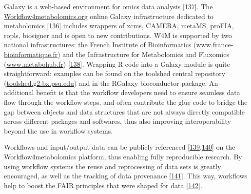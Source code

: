 \documentclass[]{article}
\begin{document}
Galaxy is a web-based environment for omics data analysis {[}\protect\hyperlink{ref-goecks_2010}{137}{]}. The \href{http://workflow4metabolomics.org}{Workflow4metabolomics.org} online Galaxy infrastructure dedicated to metabolomics {[}\protect\hyperlink{ref-giacomoni_2015}{136}{]} includes wrappers of xcms, CAMERA, metaMS, proFIA, ropls, biosigner and is open to new contributions. W4M is supported by two national infrastructures: the French Institute of Bioinformatics (\href{http://www.france-bioinformatique.fr/en}{www.france-bioinformatique.fr}) and the Infrastructure for Metabolomics and Fluxomics (\href{https://www.metabohub.fr/}{www.metabohub.fr}) {[}\protect\hyperlink{ref-metabohub_website_2019}{138}{]}. Wrapping R code into a Galaxy module is quite straightforward: examples can be found on the toolshed central repository (\href{https://toolshed.g2.bx.psu.edu/}{toolshed.g2.bx.psu.edu}) and in the RGalaxy bioconductor package. An additional benefit is that the workflow developers need to ensure seamless data flow through the workflow steps, and often contribute the glue code to bridge the gap between objects and data structures that are not always directly compatible across different packages and softwares, thus also improving interoperability beyond the use in workflow systems.

Workflows and input/output data can be publicly referenced {[}\protect\hyperlink{ref-guitton_2017}{139},\protect\hyperlink{ref-workflow4metabolomics_website_nd}{140}{]} on the Workflow4metabolomics platform, thus enabling fully reproducible research. By using workflow systems the reuse and reprocessing of data sets is greatly encouraged, as well as the tracking of data provenance {[}\protect\hyperlink{ref-goble_2019}{141}{]}. This way, workflows help to boost the FAIR principles that were shaped for data {[}\protect\hyperlink{ref-wilkinson_2016}{142}{]}.
\end{document}
